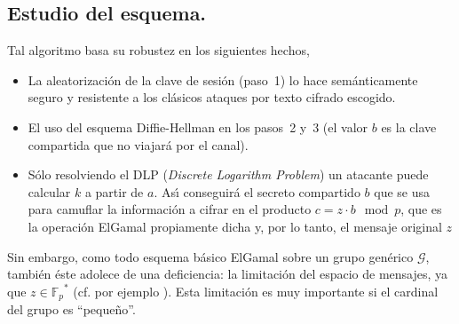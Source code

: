 \documentclass{cedi}%
\newcommand{\Fp}{\ensuremath{\mathbb{F}_p}}%
\theoremstyle{plain}        			%
\theoremstyle{definition}   			%
\theoremstyle{saltolinea}   			%
\begin{document}
\subsection*{Estudio del esquema.}

Tal algoritmo basa su robustez en los siguientes hechos,
\begin{itemize}
	\item La aleatorizaci\'on de la clave de sesi\'on (paso~1) lo hace sem\'anticamente seguro y resistente a los cl\'asicos ataques por texto cifrado escogido.
	\item El uso del esquema Diffie-Hellman en los pasos~2 y~3 (el valor $b$ es la clave compartida que no viajar\'a por el canal).
	\item S\'olo resolviendo el DLP (\emph{Discrete Logarithm Problem}) un atacante puede calcular $k$ a partir de $a$. As\'{\i} conseguir\'a el secreto compartido $b$ que se usa para camuflar la informaci\'on a cifrar en el producto $c=z\cdot b\mod p$, que es la operaci\'on ElGamal propiamente dicha y, por lo tanto, el mensaje original $z$
\end{itemize}
Sin embargo, como todo esquema b\'asico ElGamal sobre un grupo gen\'erico $\mathcal{G}$, tambi\'en \'este adolece de una deficiencia: la limitaci\'on del espacio de mensajes, ya que $z\in\Fp^*$ (cf. por ejemplo \cite{DHAES}). Esta limitaci\'on es muy importante si el cardinal del grupo es ``peque\~no''.

\end{document}
